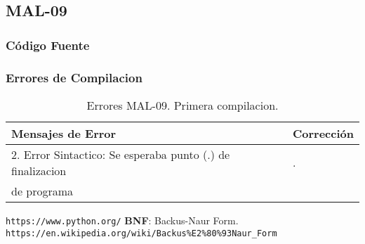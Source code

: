 \documentclass[a4paper,12pt]{article}
\begin{document}
\subsection{MAL-09}
\subsubsection{Código Fuente}

\subsubsection{Errores de Compilacion}

\begin{table}[H]
\centering
\begin{tabular}{|l|l|}
\hline
Mensajes de Error & Corrección\\
\hline
2. Error Sintactico: Se esperaba punto (.) de finalizacion	& .\\
de programa													&\\
\hline
\end{tabular}
\caption{Errores MAL-09. Primera compilacion.}
\label{MAL-09-1}
\end{table}

\begin{thebibliography}{10}
 \texttt{https://www.python.org/}
 \textbf{BNF}: Backus-Naur Form. \texttt{https://en.wikipedia.org/wiki/Backus\%E2\%80\%93Naur\_Form}
\end{thebibliography}
\end{document}
